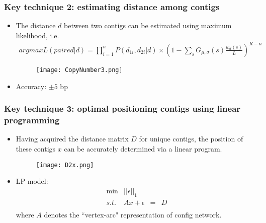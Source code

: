 \documentclass[mathserif]{beamer}
\begin{document}
	
		\begin{frame}
		\frametitle{Key technique 2: estimating distance among contigs }
		\begin{itemize} 
		\item  
		The distance $d$ between two contigs can be estimated using maximum likelihood, i.e. 
		\begin{eqnarray}
   			argmaxL(paired | d)\!=\!\prod_{i=1}^{n}P(d_{1i},d_{2i}|d)\!\times\!(1\!-\!\sum _{s}G_{\mu , \sigma}(s)\frac{w_d(s)}{L})^{R-n}
    		\end{eqnarray}
%		
			\begin{figure}
				\centering
				\texttt{[image: CopyNumber3.png]}
			\end{figure}
		
		\item Accuracy:  $\pm 5$ bp
		
		\end{itemize} 
%    		
%    		
%    		
		\end{frame}
		
		
		\begin{frame}
		\frametitle{Key technique 3: optimal positioning contigs using linear programming} 
		\begin{itemize}
			\item Having acquired the distance matrix $D$ for unique contigs, the position of these contigs $x$ can be accurately determined via a linear program. 
			\begin{figure}
				\centering
				\texttt{[image: D2x.png]}
			\end{figure}

			\item LP model: 
		\[
		\begin{array}{rrrrrrrrlr}
		 \min &   ||{\epsilon}||_1 &  &\\
		 s.t. &  Ax  +  \epsilon & = & D\\
		\end{array} \nonumber
		\]
		where $A$ denotes the ``vertex-arc" representation of config network. 
		\end{itemize}
 
		\end{frame}	
	
\end{document}
